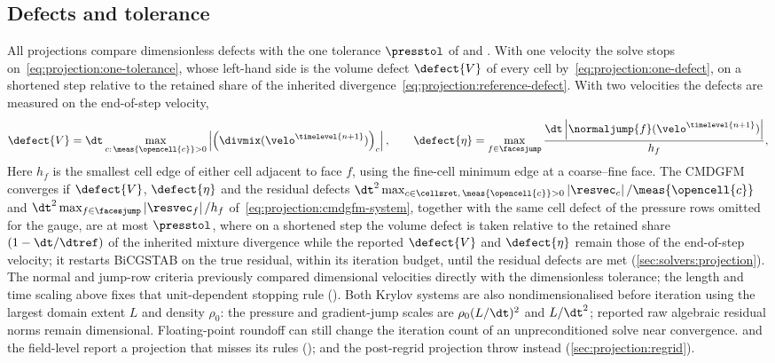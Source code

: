 \subsection{Defects and tolerance}\label{sec:projection:defects}
All projections compare dimensionless defects with the one tolerance
$\presstol$ of  and . With one velocity the
solve stops on~\cref{eq:projection:one-tolerance}, whose left-hand side is
the volume defect $\defect{V}$ of every cell by~\cref{eq:projection:one-defect},
on a shortened step relative to the retained share of the inherited
divergence~\cref{eq:projection:reference-defect}.
With two velocities the defects are measured on the end-of-step velocity,
\begin{equation}\label{eq:projection:defects}
  \begin{gathered}
  \defect{V}=\dt\max_{c:\,\meas{\opencell{c}}>0}\abs{\roundpar{\divmix(\velo^{\timelevel{n+1}})}_c},\qquad
  \defect{\eta}=\max_{f\in\facesjump}\frac{\dt\abs{\normaljump{f}(\velo^{\timelevel{n+1}})}}{h_f},
  \end{gathered}
\end{equation}
Here $h_f$ is the smallest cell edge of either cell adjacent to face $f$,
using the fine-cell minimum edge at a coarse--fine face.
The CMDGFM converges if $\defect{V}$, $\defect{\eta}$ and the residual
defects $\dt^2\max_{c\in\cellsret,\,\meas{\opencell{c}}>0}\abs{\resvec_c}/\meas{\opencell{c}}$
and $\dt^2\max_{f\in\facesjump}\abs{\resvec_f}/h_f$ of~\cref{eq:projection:cmdgfm-system},
together with the same cell defect of the pressure rows omitted for the gauge,
are at most $\presstol$, where on a shortened step the volume defect is taken
relative to the retained share $(1-\dt/\dtref)$ of the inherited mixture
divergence while the reported $\defect{V}$ and $\defect{\eta}$ remain those of
the end-of-step velocity; it restarts BiCGSTAB on the true residual, within
its iteration budget, until the residual defects are met
(\cref{sec:solvers:projection}). The normal and jump-row
criteria previously compared dimensional velocities directly with the
dimensionless tolerance; the length and time scaling above fixes that
unit-dependent stopping rule (). Both Krylov systems are also
nondimensionalised before iteration using the largest domain extent $L$ and
density $\rho_0$: the pressure and gradient-jump scales are
$\rho_0(L/\dt)^2$ and $L/\dt^2$; reported raw algebraic residual norms
remain dimensional. Floating-point roundoff can still change
the iteration count of an unpreconditioned solve near convergence.
 and the field-level  report a projection that
misses its rules ();
 and the post-regrid projection throw instead
(\cref{sec:projection:regrid}).

